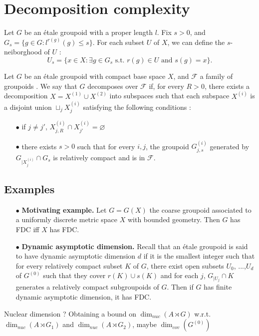 \section{Decomposition complexity}

Let $G$ be an étale groupoid with a proper length $l$. Fix $s>0$, and $G_s=\{g\in G : l^{r(g)}(g)\leq s\}$. For each subset $U$ of $X$, we can define the $s$-neiborghood of $U$ :
\[U_s = \{x\in X : \exists g\in G_s \text{ s.t. } r(g)\in U \text{ and } s(g)=x \}.\]

\begin{definition}
Let $G$ be an étale groupoid with compact base space $X$, and $\mathcal F$ a family of groupoids . We say that $G$ decomposes over $\mathcal F$ if, for every $R>0$, there exists a decomposition $X=X^{(1)}\cup X^{(2)}$ into subspaces such that each subspace $X^{(i)}$ is a disjoint union $\sqcup_j X^{(i)}_j$ satisfying the following conditions :
\begin{itemize}
\item[$\bullet$] if $j\neq j'$,  $X^{(i)}_{j,R}\cap X^{(i)}_{j'}=\varnothing$
\item[$\bullet$] there exists $s>0$ such that for every $i,j$, the groupoid $G_{j,s}^{(i)}$ generated by $G_{|X^{(i)}_j}\cap G_s$ is relatively compact and is in $\mathcal F$.
\end{itemize}
\end{definition}

\subsection{Examples}

\begin{itemize}
\item[$\bullet$] \textbf{Motivating example.} Let $G=G(X)$ the coarse groupoid associated to a uniformly discrete metric space $X$ with bounded geometry. Then $G$ has FDC iff $X$ has FDC.\\
\item[$\bullet$] \textbf{Dynamic asymptotic dimension.} Recall that an étale groupoid is said to have dynamic asymptotic dimension $d$ if it is the smallest integer such that for every relatively compact subset $K$ of $G$, there exist open subsets $U_0$, ...,$U_d$ of $G^{(0)}$ such that they cover $r(K)\cup s(K)$ and for each $j$, $G_{|U_j}\cap K$ generates a relatively compact subgroupoids of $G$. Then if $G$ has finite dynamic asymptotic dimension, it has FDC. 
\end{itemize}

Nuclear dimension ? Obtaining a bound on $\dim_{nuc}(A\rtimes G)$ w.r.t. $\dim_{nuc} (A\rtimes G_1)$ and $\dim_{nuc} (A\rtimes G_2)$, maybe $\dim_{cov}(G^{(0)})$
